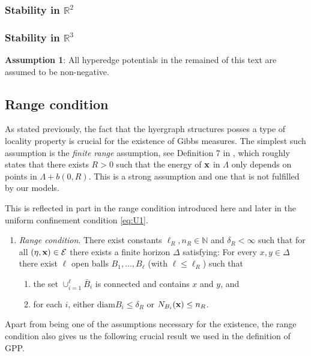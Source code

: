 \subsubsection{Stability in $\mathbb R^2$}
\tbd
\subsubsection{Stability in $\mathbb R^3$}
\tbd
{}

\noindent \textbf{Assumption 1}: All hyperedge potentials in the remained of this text are assumed to be non-negative.

\subsection{Range condition} \label{sec:range}
As stated previously, the fact that the hyergraph structures posses a type of locality property is crucial for the existence of Gibbs measures. The simplest such assumption is the \textit{finite range} assumption, see Definition 7 in \cite{Dereudre2017}, which roughly states that there exists $R>0$ such that the energy of ${\mathbf{x}}$ in $\Lambda$ only depends on points in $\Lambda + b(0,R)$. This is a strong assumption and one that is not fulfilled by our models. 

This is reflected in part in the range condition introduced here and later in the uniform confinement condition \ref{eq:U1}.

\begin{enumerate}[\textbf{(R)}]\label{(R)}
	\item \textit{Range condition}. There exist constants $\ell_R,n_R \in \mathbb N$ and $\delta_R < \infty$ such that for all $(\eta,{\mathbf{x}}) \in \mathcal E$ there exists a finite horizon $\Delta$ satisfying: For every $x,y \in \Delta$ there exist $\ell$ open balls $B_1, \dots, B_\ell$ (with $\ell \leq \ell_R$) such that
	\begin{enumerate}[-]
		\item the set $\cup^\ell_{i=1} \bar B_i$ is connected and contains $x$ and $y$, and 
		\item for each $i$, either $\text{diam} B_i \leq \delta_R$ or $N_{B_i}({\mathbf{x}}) \leq n_R$.
	\end{enumerate}
\end{enumerate}


Apart from being one of the assumptions necessary for the existence, the range condition also gives us the following crucial result we used in the definition of GPP.

